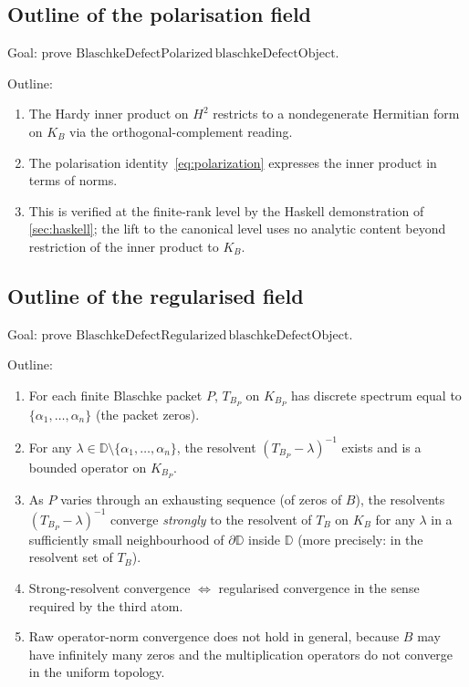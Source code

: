 \documentclass[12pt]{article}
\theoremstyle{definition}
\theoremstyle{remark}
\newcommand{\BS}{B}
\newcommand{\KB}{K_{B}}
\newcommand{\KBP}{K_{B_{P}}}
\newcommand{\D}{\mathbb{D}}
\begin{document}
\subsection{Outline of the polarisation field}

Goal: prove $\mathrm{BlaschkeDefectPolarized}\,\mathrm{blaschkeDefectObject}$.

Outline:
\begin{enumerate}
  \item The Hardy inner product on $H^{2}$ restricts to a nondegenerate Hermitian form on $\KB$ via the orthogonal-complement reading.
  \item The polarisation identity~\eqref{eq:polarization} expresses the inner product in terms of norms.
  \item This is verified at the finite-rank level by the Haskell demonstration of \cref{sec:haskell}; the lift to the canonical level uses no analytic content beyond restriction of the inner product to $\KB$.
\end{enumerate}

\subsection{Outline of the regularised field}

Goal: prove $\mathrm{BlaschkeDefectRegularized}\,\mathrm{blaschkeDefectObject}$.

Outline:
\begin{enumerate}
  \item For each finite Blaschke packet $P$, $T_{\BS_{P}}$ on $\KBP$ has discrete spectrum equal to $\{ \alpha_{1}, \dots, \alpha_{n} \}$ (the packet zeros).
  \item For any $\lambda \in \D \setminus \{ \alpha_{1}, \dots, \alpha_{n} \}$, the resolvent $(T_{\BS_{P}} - \lambda)^{-1}$ exists and is a bounded operator on $\KBP$.
  \item As $P$ varies through an exhausting sequence (of zeros of $\BS$), the resolvents $(T_{\BS_{P}} - \lambda)^{-1}$ converge \emph{strongly} to the resolvent of $T_{\BS}$ on $\KB$ for any $\lambda$ in a sufficiently small neighbourhood of $\partial \D$ inside $\D$ (more precisely: in the resolvent set of $T_{\BS}$).
  \item Strong-resolvent convergence $\Leftrightarrow$ regularised convergence in the sense required by the third atom.
  \item Raw operator-norm convergence does not hold in general, because $\BS$ may have infinitely many zeros and the multiplication operators do not converge in the uniform topology.
\end{enumerate}
\end{document}
